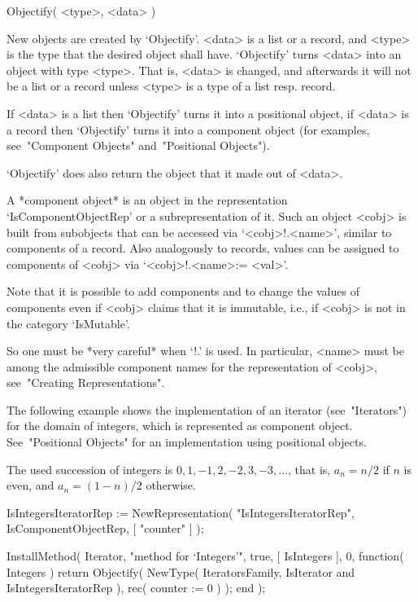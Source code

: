 
\>Objectify( <type>, <data> )

New objects are created by `Objectify'.
<data> is a list or a record, and <type> is the type that the desired
object shall have.
`Objectify' turns <data> into an object with type <type>.
That is, <data> is changed, and afterwards it will not be a list or a
record unless <type> is a type of a list resp. record.

If <data> is a list then `Objectify' turns it into a positional object,
if <data> is a record then `Objectify' turns it into a component object
(for examples, see~"Component Objects" and~"Positional Objects").

`Objectify' does also return the object that it made out of <data>.


A *component object* is an object in the representation
`IsComponentObjectRep' or a subrepresentation of it.
Such an object <cobj> is built from subobjects that can be accessed via
`<cobj>!.<name>', similar to components of a record.
Also analogously to records, values can be assigned to components of
<cobj> via `<cobj>!.<name>:= <val>'.

Note that it is possible to add components and to change the values of
components even if <cobj> claims that it is immutable, i.e., if <cobj>
is not in the category `IsMutable'.

So one must be *very careful* when `!.' is used.
In particular, <name> must be among the admissible component names for
the representation of <cobj>, see~"Creating Representations".

The following example shows the implementation of an iterator
(see~"Iterators") for the domain of integers,
which is represented as component object.
See~"Positional Objects" for an implementation using positional objects.

The used succession of integers is $0, 1, -1, 2, -2, 3, -3, \ldots$,
that is, $a_n = n/2$ if $n$ is even,
and $a_n = (1-n)/2$ otherwise.

\begintt
    IsIntegersIteratorRep := NewRepresentation( "IsIntegersIteratorRep",
        IsComponentObjectRep, [ "counter" ] );

    InstallMethod( Iterator,
        "method for `Integers'",
        true,
        [ IsIntegers ], 0,
        function( Integers )
        return Objectify( NewType( IteratorsFamily,
                                       IsIterator
                                   and IsIntegersIteratorRep ),
                          rec( counter := 0 ) );
        end );

